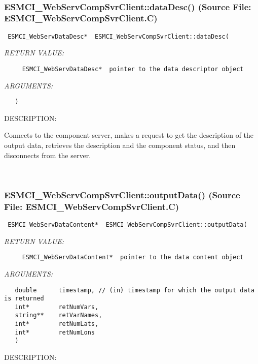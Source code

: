  
\mbox{}\hrulefill\
 
\subsubsection{ESMCI\_WebServCompSvrClient::dataDesc() (Source File: ESMCI\_WebServCompSvrClient.C)}


  
\begin{verbatim} ESMCI_WebServDataDesc*  ESMCI_WebServCompSvrClient::dataDesc(\end{verbatim}{\em RETURN VALUE:}
\begin{verbatim}     ESMCI_WebServDataDesc*  pointer to the data descriptor object\end{verbatim}{\em ARGUMENTS:}
\begin{verbatim}   )\end{verbatim}
{\sf DESCRIPTION:\\ }


      Connects to the component server, makes a request to get the description
      of the output data, retrieves the description and the component status,
      and then disconnects from the server.
   
 
\mbox{}\hrulefill\
 
\subsubsection{ESMCI\_WebServCompSvrClient::outputData() (Source File: ESMCI\_WebServCompSvrClient.C)}


  
\begin{verbatim} ESMCI_WebServDataContent*  ESMCI_WebServCompSvrClient::outputData(\end{verbatim}{\em RETURN VALUE:}
\begin{verbatim}     ESMCI_WebServDataContent*  pointer to the data content object\end{verbatim}{\em ARGUMENTS:}
\begin{verbatim}   double      timestamp, // (in) timestamp for which the output data is returned
   int*        retNumVars,
   string**    retVarNames,
   int*        retNumLats,
   int*        retNumLons
   )\end{verbatim}
{\sf DESCRIPTION:\\ }


